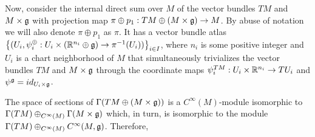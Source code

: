Now, consider the internal direct sum over $M$ of the vector bundles $TM$ and $M \times \mathfrak{g}$ with projection map $\pi \oplus p_1: TM \oplus (M \times \mathfrak{g}) \to M$. By abuse of notation we will also denote $\pi \oplus p_1$ as $\pi$. %
It has a vector bundle atlas $\left\{ (U_i, \psi^\oplus_i: U_i \times (\mathbb{R}^{n_i} \oplus \mathfrak{g}) \to \pi^{-1}(U_i) ) \right\}_{i \in I}$, where $n_i$ is some positive integer and $U_i$ is a chart neighborhood of $M$ that simultaneously trivializes the vector bundles $TM$ and $M \times \mathfrak{g}$ through the coordinate maps $\psi^{TM}_i: U_i \times \mathbb{R}^{n_i} \to TU_i$  and $\psi^{\mathfrak{g}} = id_{U_i \times \mathfrak{g}}$.

The space of sections of $\Gamma(TM \oplus (M \times \mathfrak{g}))$ is a $C^\infty(M)$-module isomorphic to $\Gamma(TM) \oplus_{C^\infty(M)}\Gamma(M \times \mathfrak{g})$ which, in turn, is isomorphic to the module $\Gamma(TM) \oplus_{C^\infty(M)} C^\infty(M, \mathfrak{g})$. Therefore, 

